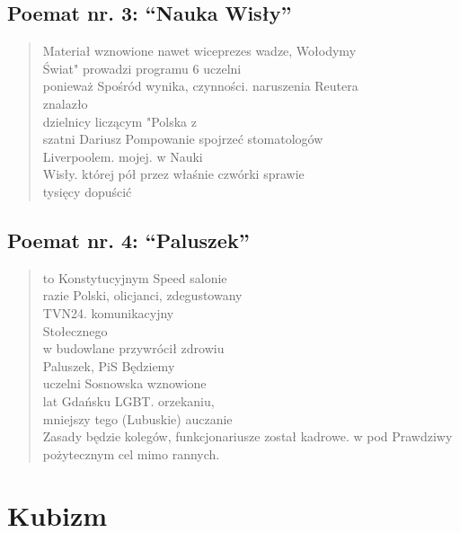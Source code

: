 \documentclass[a4paper]{article}
\begin{document}
\subsection{Poemat nr. 3: ``Nauka Wisły''}
\begin{quote}
Materiał wznowione nawet wiceprezes wadze, Wołodymy \\
Świat" prowadzi programu 6 uczelni \\
ponieważ Spośród wynika, czynności. naruszenia Reutera \\
znalazło \\
dzielnicy liczącym "Polska z \\
szatni Dariusz Pompowanie spojrzeć stomatologów \\
Liverpoolem. mojej. w Nauki \\
Wisły. której pół przez właśnie czwórki sprawie \\
tysięcy dopuścić \\
\end{quote}
\subsection{Poemat nr. 4: ``Paluszek''}
\begin{quote}
to Konstytucyjnym Speed salonie \\
razie Polski, olicjanci, zdegustowany \\
TVN24. komunikacyjny \\
Stołecznego \\
w budowlane przywrócił zdrowiu \\
Paluszek, PiS Będziemy \\
uczelni Sosnowska wznowione \\
lat Gdańsku LGBT. orzekaniu, \\
mniejszy tego (Lubuskie) auczanie \\
Zasady będzie kolegów, funkcjonariusze został kadrowe. w pod Prawdziwy pożytecznym cel mimo rannych.\\
\end{quote}
\section{Kubizm}
\end{document}
